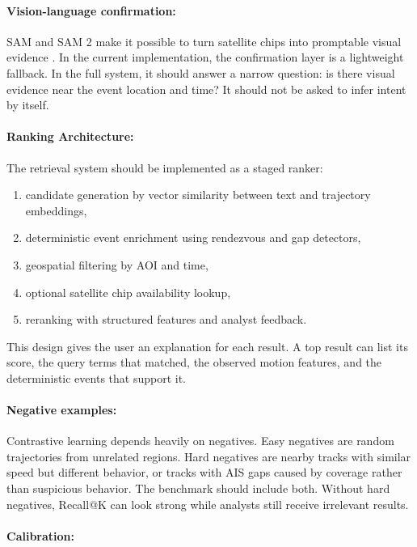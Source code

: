 \documentclass{article}
\begin{document}
\paragraph{Vision-language confirmation:}

SAM and SAM 2 make it possible to turn satellite chips into promptable visual evidence \citep{kirillov2023segment,ravi2024sam2}. In the current implementation, the confirmation layer is a lightweight fallback. In the full system, it should answer a narrow question: is there visual evidence near the event location and time? It should not be asked to infer intent by itself.

\paragraph{Ranking Architecture:}

The retrieval system should be implemented as a staged ranker:
\begin{enumerate}
  \item candidate generation by vector similarity between text and trajectory embeddings,
  \item deterministic event enrichment using rendezvous and gap detectors,
  \item geospatial filtering by AOI and time,
  \item optional satellite chip availability lookup,
  \item reranking with structured features and analyst feedback.
\end{enumerate}
This design gives the user an explanation for each result. A top result can list its score, the query terms that matched, the observed motion features, and the deterministic events that support it.

\paragraph{Negative examples:}

Contrastive learning depends heavily on negatives. Easy negatives are random trajectories from unrelated regions. Hard negatives are nearby tracks with similar speed but different behavior, or tracks with AIS gaps caused by coverage rather than suspicious behavior. The benchmark should include both. Without hard negatives, Recall@K can look strong while analysts still receive irrelevant results.

\paragraph{Calibration:}
\end{document}
